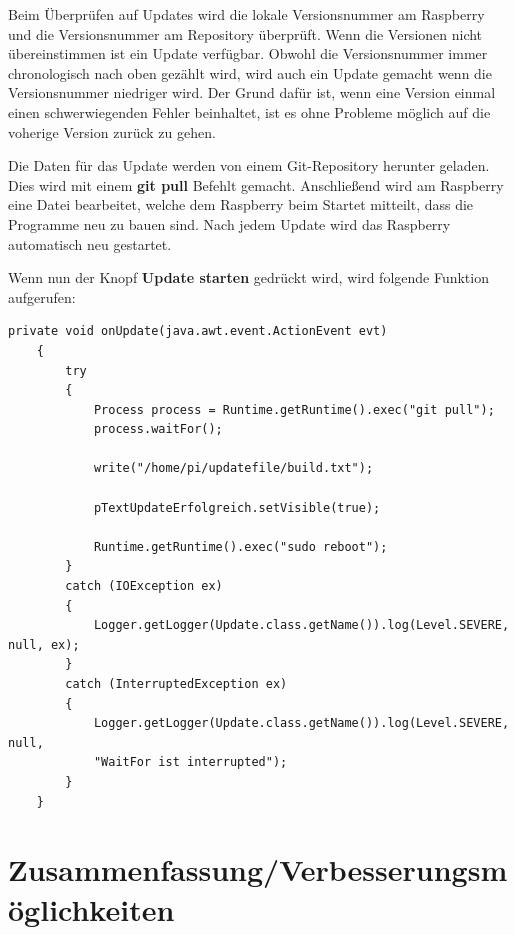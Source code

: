 \vspace{10pt}

Beim Überprüfen auf Updates wird die lokale Versionsnummer am Raspberry und die Versionsnummer am Repository überprüft. Wenn die Versionen nicht übereinstimmen ist ein Update verfügbar. Obwohl die Versionsnummer immer chronologisch nach oben gezählt wird, wird auch ein Update gemacht wenn die Versionsnummer niedriger wird. Der Grund dafür ist, wenn eine Version einmal einen schwerwiegenden Fehler beinhaltet, ist es ohne Probleme möglich auf die voherige Version zurück zu gehen. 

\vspace{10pt}

Die Daten für das Update werden von einem Git-Repository herunter geladen. Dies wird mit einem \textbf{git pull} Befehlt gemacht. Anschließend wird am Raspberry eine Datei bearbeitet, welche dem Raspberry beim Startet mitteilt, dass die Programme neu zu bauen sind. Nach jedem Update wird das Raspberry automatisch neu gestartet.

\vspace{10pt}

Wenn nun der Knopf \textbf{Update starten} gedrückt wird, wird folgende Funktion aufgerufen:
\begin{lstlisting}[style=JavaStyle, caption= Update]
    private void onUpdate(java.awt.event.ActionEvent evt)                          
    {                              
        try
        {
            Process process = Runtime.getRuntime().exec("git pull");
            process.waitFor();
            
            write("/home/pi/updatefile/build.txt");
            
            pTextUpdateErfolgreich.setVisible(true);
            
            Runtime.getRuntime().exec("sudo reboot");
        }
        catch (IOException ex)
        {
            Logger.getLogger(Update.class.getName()).log(Level.SEVERE, null, ex);
        }
        catch (InterruptedException ex)
        {
            Logger.getLogger(Update.class.getName()).log(Level.SEVERE, null, 
            "WaitFor ist interrupted");
        }        
    }
\end{lstlisting}


\newpage

\section{Zusammenfassung/Verbesserungsmöglichkeiten}

